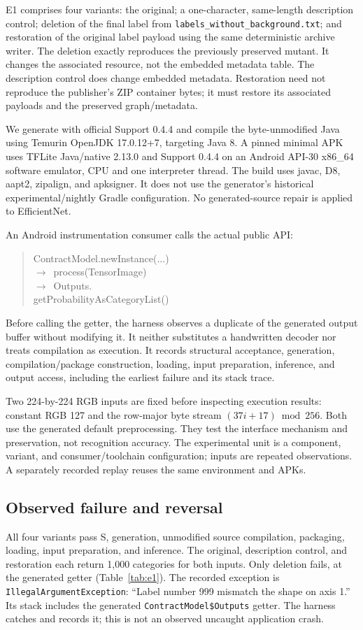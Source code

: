 \documentclass[10pt,twocolumn,letterpaper]{article}
\newcommand{\code}[1]{\texttt{#1}}
\begin{document}
E1 comprises four variants: the original; a one-character, same-length description control; deletion of the final label from \code{labels\_without\_background.txt}; and restoration of the original label payload using the same deterministic archive writer. The deletion exactly reproduces the previously preserved mutant. It changes the associated resource, not the embedded metadata table. The description control does change embedded metadata. Restoration need not reproduce the publisher's ZIP container bytes; it must restore its associated payloads and the preserved graph/metadata.

We generate with official Support 0.4.4 and compile the byte-unmodified Java using Temurin OpenJDK 17.0.12+7, targeting Java 8. A pinned minimal APK uses TFLite Java/native 2.13.0 and Support 0.4.4 on an Android API-30 x86\_64 software emulator, CPU and one interpreter thread. The build uses javac, D8, aapt2, zipalign, and apksigner. It does not use the generator's historical experimental/nightly Gradle configuration. No generated-source repair is applied to EfficientNet.

An Android instrumentation consumer calls the actual public API:
\begin{quote}\small\ttfamily\raggedright
ContractModel.newInstance(...)\\
\quad\(\rightarrow\)\ process(TensorImage)\\
\quad\(\rightarrow\)\ Outputs.\\
\hspace*{1.4em}getProbabilityAsCategoryList()
\end{quote}
Before calling the getter, the harness observes a duplicate of the generated output buffer without modifying it. It neither substitutes a handwritten decoder nor treats compilation as execution. It records structural acceptance, generation, compilation/package construction, loading, input preparation, inference, and output access, including the earliest failure and its stack trace.

Two 224-by-224 RGB inputs are fixed before inspecting execution results: constant RGB 127 and the row-major byte stream $(37i+17)\bmod256$. Both use the generated default preprocessing. They test the interface mechanism and preservation, not recognition accuracy. The experimental unit is a component, variant, and consumer/toolchain configuration; inputs are repeated observations. A separately recorded replay reuses the same environment and APKs.

\subsection{Observed failure and reversal}
All four variants pass S, generation, unmodified source compilation, packaging, loading, input preparation, and inference. The original, description control, and restoration each return 1,000 categories for both inputs. Only deletion fails, at the generated getter (Table~\ref{tab:e1}). The recorded exception is \code{IllegalArgumentException}: ``Label number 999 mismatch the shape on axis 1.'' Its stack includes the generated \code{ContractModel\$Outputs} getter. The harness catches and records it; this is not an observed uncaught application crash.
\end{document}
